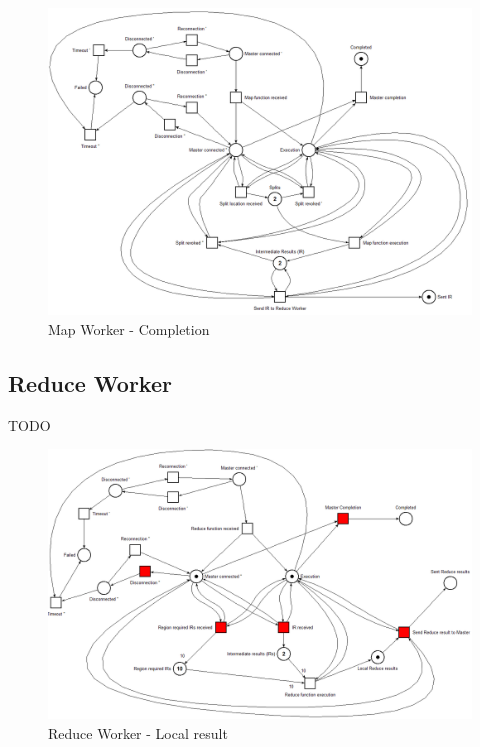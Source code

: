 \begin{figure}[!ht]
    \centering
    \includegraphics[width=\linewidth]{document/chapters/chapter_6/images/map_worker_petri_net_4.png}
    \caption{Map Worker - Completion}
    \label{fig:map_worker_petri_net_4}
\end{figure}

\subsection{Reduce Worker}
TODO

\begin{figure}[!ht]
    \centering
    \includegraphics[width=\linewidth]{document/chapters/chapter_6/images/reduce_worker_petri_net_1.png}
    \caption{Reduce Worker - Local result}
    \label{fig:reduce_worker_petri_net_1}
\end{figure}

